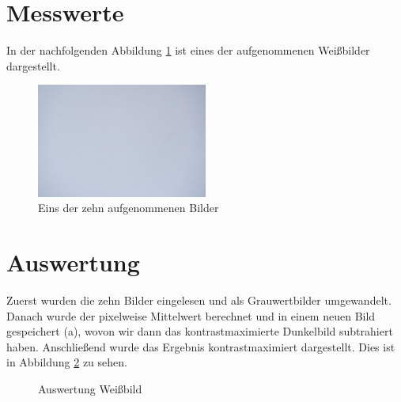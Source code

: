\documentclass[12pt, oneside, a4paper, \docLanguage]{report}
\begin{document}
\section{Messwerte}
\label{chap:VERSUCH_3_MESSWERTE}
In der nachfolgenden Abbildung \ref{fig:VERSUCH_3_MESSWERTE_WHITE} ist eines der aufgenommenen Weißbilder dargestellt.
\begin{figure}[H]
	\centering\small
	\includegraphics[width=0.5\textwidth]{media/whiteScaled.png}
	\caption{Eins der zehn aufgenommenen Bilder}
	\label{fig:VERSUCH_3_MESSWERTE_WHITE}
\end{figure}
\section{Auswertung}
\label{chap:VERSUCH_3_AUSWERTUNG}
Zuerst wurden die zehn Bilder eingelesen und als Grauwertbilder umgewandelt. Danach wurde der pixelweise Mittelwert berechnet und in einem neuen Bild gespeichert (a), wovon wir dann das kontrastmaximierte Dunkelbild subtrahiert haben. Anschließend wurde das Ergebnis kontrastmaximiert dargestellt. Dies ist in Abbildung  \ref{fig:VERSUCH_3_AUSWERTUNG_WHITEIMG} zu sehen.

\begin{figure}[hbt!]
      \centering
      \hfill
      \caption{Auswertung Weißbild}
      \label{fig:VERSUCH_3_AUSWERTUNG_WHITEIMG}
\end{figure}
\end{document}
